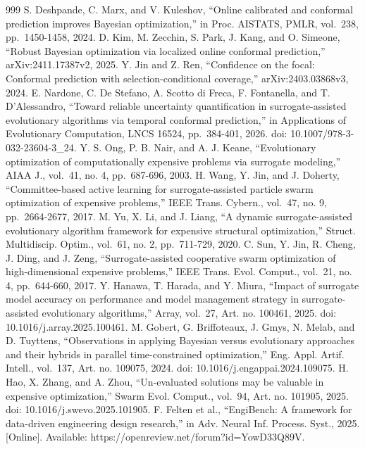 \documentclass[cmc,article,submit,moreauthors,pdftex]{Definitions/tsp}
\begin{document}
\begin{thebibliography}{999}
S. Deshpande, C. Marx, and V. Kuleshov, ``Online calibrated and conformal prediction improves Bayesian optimization,'' in Proc. AISTATS, PMLR, vol.~238, pp.~1450-1458, 2024.
D. Kim, M. Zecchin, S. Park, J. Kang, and O. Simeone, ``Robust Bayesian optimization via localized online conformal prediction,'' arXiv:2411.17387v2, 2025.
Y. Jin and Z. Ren, ``Confidence on the focal: Conformal prediction with selection-conditional coverage,'' arXiv:2403.03868v3, 2024.
E. Nardone, C. De Stefano, A. Scotto di Freca, F. Fontanella, and T. D'Alessandro, ``Toward reliable uncertainty quantification in surrogate-assisted evolutionary algorithms via temporal conformal prediction,'' in Applications of Evolutionary Computation, LNCS 16524, pp.~384-401, 2026. doi: 10.1007/978-3-032-23604-3\_24.
Y. S. Ong, P. B. Nair, and A. J. Keane, ``Evolutionary optimization of computationally expensive problems via surrogate modeling,'' AIAA J., vol.~41, no. 4, pp.~687-696, 2003.
H. Wang, Y. Jin, and J. Doherty, ``Committee-based active learning for surrogate-assisted particle swarm optimization of expensive problems,'' IEEE Trans. Cybern., vol.~47, no. 9, pp.~2664-2677, 2017.
M. Yu, X. Li, and J. Liang, ``A dynamic surrogate-assisted evolutionary algorithm framework for expensive structural optimization,'' Struct. Multidiscip. Optim., vol.~61, no. 2, pp.~711-729, 2020.
C. Sun, Y. Jin, R. Cheng, J. Ding, and J. Zeng, ``Surrogate-assisted cooperative swarm optimization of high-dimensional expensive problems,'' IEEE Trans. Evol. Comput., vol.~21, no. 4, pp.~644-660, 2017.
Y. Hanawa, T. Harada, and Y. Miura, ``Impact of surrogate model accuracy on performance and model management strategy in surrogate-assisted evolutionary algorithms,'' Array, vol.~27, Art. no. 100461, 2025. doi: 10.1016/j.array.2025.100461.
M. Gobert, G. Briffoteaux, J. Gmys, N. Melab, and D. Tuyttens, ``Observations in applying Bayesian versus evolutionary approaches and their hybrids in parallel time-constrained optimization,'' Eng. Appl. Artif. Intell., vol.~137, Art. no. 109075, 2024. doi: 10.1016/j.engappai.2024.109075.
H. Hao, X. Zhang, and A. Zhou, ``Un-evaluated solutions may be valuable in expensive optimization,'' Swarm Evol. Comput., vol.~94, Art. no. 101905, 2025. doi: 10.1016/j.swevo.2025.101905.
F. Felten et al., ``EngiBench: A framework for data-driven engineering design research,'' in Adv. Neural Inf. Process. Syst., 2025. {[}Online{]}. Available: https://openreview.net/forum?id=YowD33Q89V.

\end{thebibliography}
\end{document}

